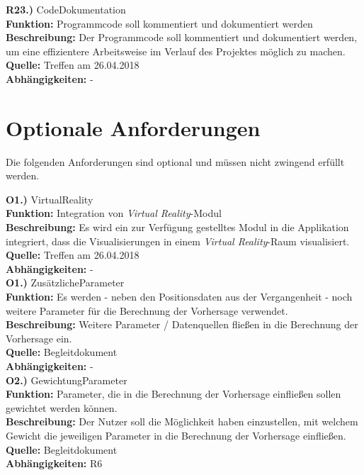 \documentclass[12pt]{article} %
\begin{document}
\textbf{R23.)} CodeDokumentation \\
\textbf{Funktion:} Programmcode soll kommentiert und dokumentiert werden \\
\textbf{Beschreibung:} Der Programmcode soll kommentiert und dokumentiert werden, um eine effizientere Arbeitsweise im Verlauf des Projektes möglich zu machen. \\
\textbf{Quelle:} Treffen am 26.04.2018 \\
\textbf{Abhängigkeiten:} - \\

 \section{Optionale Anforderungen} \label{optionale_anforderungen}

 Die folgenden Anforderungen sind optional und müssen nicht zwingend erfüllt werden.

\textbf{O1.)} VirtualReality \\
\textbf{Funktion:} Integration von \textit{Virtual Reality}-Modul \\
\textbf{Beschreibung:} Es wird ein zur Verfügung gestelltes Modul in die Applikation integriert, dass die Visualisierungen in einem \textit{Virtual Reality}-Raum visualisiert. \\
\textbf{Quelle:} Treffen am 26.04.2018 \\
\textbf{Abhängigkeiten:} - \\

\textbf{O1.)} ZusätzlicheParameter \\
\textbf{Funktion:} Es werden - neben den Positionsdaten aus der Vergangenheit - noch weitere Parameter für die Berechnung der Vorhersage verwendet. \\
\textbf{Beschreibung:} Weitere Parameter / Datenquellen fließen in die Berechnung der Vorhersage ein. \\
\textbf{Quelle:} Begleitdokument \\
\textbf{Abhängigkeiten:} - \\

\textbf{O2.)} GewichtungParameter \\
\textbf{Funktion:} Parameter, die in die Berechnung der Vorhersage einfließen sollen gewichtet werden können. \\
\textbf{Beschreibung:} Der Nutzer soll die Möglichkeit haben einzustellen, mit welchem Gewicht die jeweiligen Parameter in die Berechnung der Vorhersage einfließen.\\
\textbf{Quelle:} Begleitdokument \\
\textbf{Abhängigkeiten:} R6 \\
\end{document}
